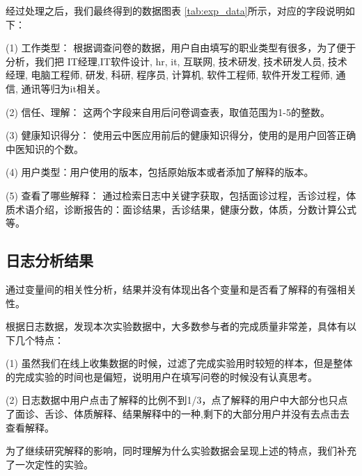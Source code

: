经过处理之后，我们最终得到的数据图表 \ref{tab:exp_data}所示，对应的字段说明如下：

(1) 工作类型： 根据调查问卷的数据，用户自由填写的职业类型有很多，为了便于分析，我们把 IT经理,IT软件设计, hr, it, 互联网, 技术研发, 技术研发人员, 技术经理, 电脑工程师, 研发, 科研, 程序员, 计算机, 软件工程师, 软件开发工程师, 通信, 通讯等归为it相关。

(2) 信任、理解： 这两个字段来自用后问卷调查表，取值范围为1-5的整数。

(3) 健康知识得分： 使用云中医应用前后的健康知识得分，使用的是用户回答正确中医知识的个数。

(4) 用户类型：用户使用的版本，包括原始版本或者添加了解释的版本。

(5) 查看了哪些解释： 通过检索日志中关键字获取，包括面诊过程，舌诊过程，体质术语介绍，诊断报告的：面诊结果，舌诊结果，健康分数，体质，分数计算公式等。

\subsection{日志分析结果}

通过变量间的相关性分析，结果并没有体现出各个变量和是否看了解释的有强相关性。

根据日志数据，发现本次实验数据中，大多数参与者的完成质量非常差，具体有以下几个特点：

(1) 虽然我们在线上收集数据的时候，过滤了完成实验用时较短的样本，但是整体的完成实验的时间也是偏短，说明用户在填写问卷的时候没有认真思考。

(2) 日志数据中用户点击了解释的比例不到1/3，点了解释的用户中大部分也只点了面诊、舌诊、体质解释、结果解释中的一种,剩下的大部分用户并没有去点击去查看解释。

为了继续研究解释的影响，同时理解为什么实验数据会呈现上述的特点，我们补充了一次定性的实验。









